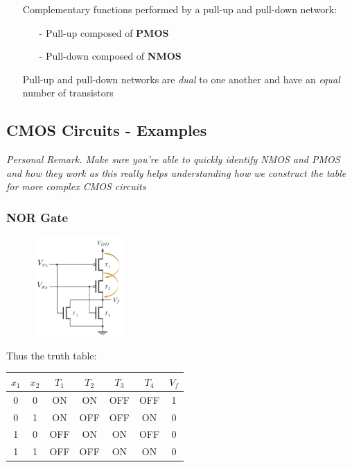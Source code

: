 \documentclass[12pt,openany, tikz,border=10pt]{book}
\begin{document}
			      	\begin{itemize}
			      		\item[] Complementary functions performed by a pull-up and pull-down network:
			      		      \begin{itemize}
			      		      	\item[-] Pull-up composed of \textbf{PMOS}
			      		      	\item[-] Pull-down composed of \textbf{NMOS}
			      		      \end{itemize}
			      		\item[] Pull-up and pull-down networks are \textit{dual} to one another and have an \textit{equal} number of transistors
			      	\end{itemize}
			      	
			      	\subsection{CMOS Circuits - Examples}
			      	\textit{Personal Remark. Make sure you're able to quickly identify NMOS and PMOS and how they work as this really helps understanding how we construct the table for more complex CMOS circuits}
			      	\subsubsection{NOR Gate}
			      	\begin{figure}[h]
			      		\centering
			      		\includegraphics[width=0.3\textwidth]{circuits/9.1.5.png} %
			      	\end{figure}
			      	Thus the truth table: 
			      	\begin{center}
			      		\begin{tabular}{ |c|c||c|c|c|c||c| }
			      			\hline
			      			\( x_1 \) & \( x_2 \) & \( T_1 \) & \( T_2 \) & \( T_3 \) & \( T_4 \) & \( V_f \) \\
			      			\hline
			      			0         & 0         & ON        & ON        & OFF       & OFF       & 1         \\
			      			0         & 1         & ON        & OFF       & OFF       & ON        & 0         \\
			      			1         & 0         & OFF       & ON        & ON        & OFF       & 0         \\
			      			1         & 1         & OFF       & OFF       & ON        & ON        & 0         \\
			      			\hline
			      		\end{tabular}
			      	\end{center}
			      	
\end{document}
